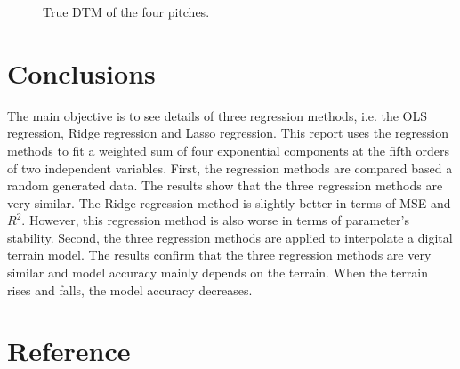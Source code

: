 \documentclass[a4paper]{article}
\begin{document}
\begin{figure}[htbp]
    \centering
\newline 
    \caption{True DTM of the four pitches.}
    \label{figTrueDTM}
\end{figure}

\section{Conclusions}\label{sec:conclusions}
The main objective is to see details of three regression methods, i.e. the OLS regression, Ridge regression and Lasso regression. This report uses the regression methods to fit a weighted sum of four exponential components at the fifth orders of two independent variables. First, the regression methods are compared based a random generated data. The results show that the three regression methods are very similar. The Ridge regression method is slightly better in terms of MSE and $R^{2}$. However, this regression method is also worse in terms of parameter's stability. Second, the three regression methods are applied to interpolate a digital terrain model. The results confirm that the three regression methods are very similar and model accuracy mainly depends on the terrain. When the terrain rises and falls, the model accuracy decreases.  
\section{Reference}\label{sec:reference}


\end{document}
